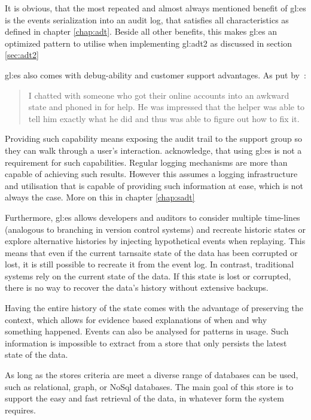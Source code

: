 It is obvious, that the most repeated and almost always mentioned benefit of \gls{gl:es} is the events serialization into an audit log, that satisfies all characteristics as defined in chapter \ref{chap:adt}. Beside all other benefits, this makes \gls{gl:es} an optimized pattern to utilise when implementing \gls{gl:adt2} as discussed in section \ref{sec:adt2}

\gls{gl:es} also comes with debug-ability and customer support advantages. As put by~\citep{fowleres}:

\begin{quote}
  I chatted with someone who got their online accounts into an awkward state and phoned in for help. He was impressed that the helper was able to tell him exactly what he did and thus was able to figure out how to fix it.
\end{quote}

Providing such capability means exposing the audit trail to the support group so they can walk through a user's interaction. \citep{fowleres} acknowledge, that using \gls{gl:es} is not a requirement for such capabilities. Regular logging mechanisms are more than capable of achieving such results. However this assumes a logging infrastructure and utilisation that is capable of providing such information at ease, which is not always the case. More on this in chapter \ref{chap:sadt}

Furthermore, \gls{gl:es} allows developers and auditors to consider multiple time-lines (analogous to branching in version control systems) and recreate historic states or explore alternative histories by injecting hypothetical events when replaying. This means that even if the current tarnsaite state of the data has been corrupted or lost, it is still possible to recreate it from the event log. In contrast, traditional systems rely on the current state of the data. If this state is lost or corrupted, there is no way to recover the data's history without extensive backups.

Having the entire history of the state comes with the advantage of preserving the context, which allows for evidence based explanations of when and why something happened. Events can also be analysed for patterns in usage. Such information is impossible to extract from a store that only persists the latest state of the data.

As long as the stores criteria are meet a diverse range of databases can be used, such as relational, graph, or NoSql databases. The main goal of this store is to support the easy and fast retrieval of the data, in whatever form the system requires.


